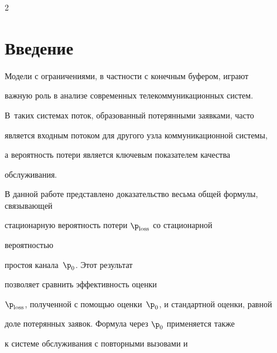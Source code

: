




      \thispagestyle{headings}





      \begin{multicols}{2}





            \label{st\stat}








\section{Введение} 








Модели с ограничениями, в частности с конечным буфером, играют


важную роль в анализе современных     телекоммуникационных систем. 


В~таких системах поток, образованный потерянными заявками, часто


является входным потоком для другого узла коммуникационной системы,


а вероятность потери является ключевым показателем качества


обслуживания.








В данной работе  представлено  доказательство весьма общей формулы, связывающей


стационарную вероятность потери $\p_{\mathrm{loss}}$ со ста\-цио\-нарной\linebreak


вероятностью


простоя канала~$\p_0$.  Этот результат\linebreak


 позволяет сравнить эффективность оценки


$\p_{\mathrm{loss}}$, полученной с помощью оценки~$\p_0$, и  стандартной оценки, равной


доле потерянных заявок.  Формула через $\p_0$ применяется также


 к системе обслуживания с повторными вызовами и



\end{multicols}
